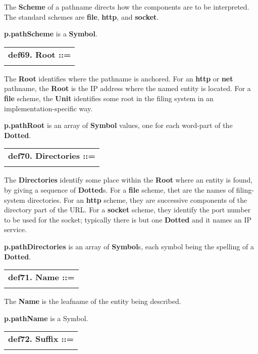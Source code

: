 \documentclass{report}
\begin{document}
The {\bf Scheme} of a pathname directs how the components are to be interpreted.
The standard schemes are {\bf file}, {\bf http}, and {\bf socket}.

{\bf p.pathScheme} is a {\bf Symbol}.

\begin{tabular}{l}
{\bf def69. Root ::= }\\ 
\hspace*{3mm}{\tt "//" Dotted} \\ 
\end{tabular}

The {\bf Root} identifies where the pathname is anchored. For an {\bf http} or {\bf net}
pathname, the {\bf Root} is the IP address where the named entity is located. For
a {\bf file} scheme, the {\bf Unit} identifies some root in the filing system in
an implementation-specific way.

{\bf p.pathRoot} is an array of {\bf Symbol} values, one for each word-part of the
{\bf Dotted}.

\begin{tabular}{l}
{\bf def70. Directories ::= }\\ 
\hspace*{3mm}{\tt {[}("/"){]} (Dotted "/")++} \\ 
\end{tabular}

The {\bf Directories} identify some place within the {\bf Root} where an entity is
found, by giving a sequence of {\bf Dotted}s. For a {\bf file} scheme, thet are the
names of filing-system directories. For an {\bf http} scheme, they are successive
components of the directory part of the URL. For a {\bf socket} scheme, they
identify the port number to be used for the socket; typically there is but one
{\bf Dotted} and it names an IP service.

{\bf p.pathDirectories} is an array of {\bf Symbol}s, each symbol being the spelling
of a {\bf Dotted}.

\begin{tabular}{l}
{\bf def71. Name ::= }\\ 
\hspace*{3mm}{\tt Word} \\ 
\end{tabular}

The {\bf Name} is the leafname of the entity being described.

{\bf p.pathName} is a Symbol.

\begin{tabular}{l}
{\bf def72. Suffix ::= }\\ 
\hspace*{3mm}{\tt "." Word} \\ 
\end{tabular}
\end{document}
